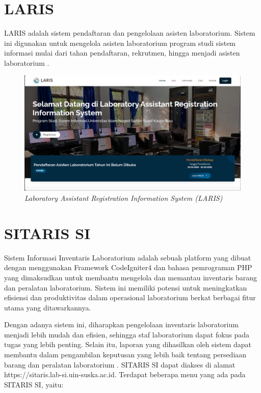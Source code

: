 \section{LARIS}
LARIS adalah sistem pendaftaran dan pengelolaan asisten laboratorium. Sistem ini digunakan untuk mengelola asisten laboratorium program studi sistem informasi mulai dari tahan pendaftaran, rekrutmen, hingga menjadi asisten laboratorium \cite{web-prodi}.

\begin{figure}
	\centering
	\includegraphics[width=0.82\linewidth]{konten//gambar/laris.png}
	\caption{\textit{Laboratory Assistant Registration Information System (LARIS)} \protect\cite{web-prodi}}
	\label{fig:enter-label}
\end{figure}

\section{SITARIS SI}
Sistem Informasi Inventaris Laboratorium adalah sebuah platform yang dibuat dengan menggunakan Framework CodeIgniter4 dan bahasa pemrograman PHP yang dimaksudkan untuk membantu mengelola dan memantau inventaris barang dan peralatan laboratorium. Sistem ini memiliki potensi untuk meningkatkan efisiensi dan produktivitas dalam operasional laboratorium berkat berbagai fitur utama yang ditawarkannya.

Dengan adanya sistem ini, diharapkan pengelolaan inventaris laboratorium menjadi lebih mudah dan efisien, sehingga staf laboratorium dapat fokus pada tugas yang lebih penting. Selain itu, laporan yang dihasilkan oleh sistem dapat membantu dalam pengambilan keputusan yang lebih baik tentang persediaan barang dan peralatan laboratorium \cite{sitaris-lab-si-website}. SITARIS SI dapat diakses di alamat https://sitaris.lab-si.uin-suska.ac.id. Terdapat beberapa menu yang ada pada SITARIS SI, yaitu:

